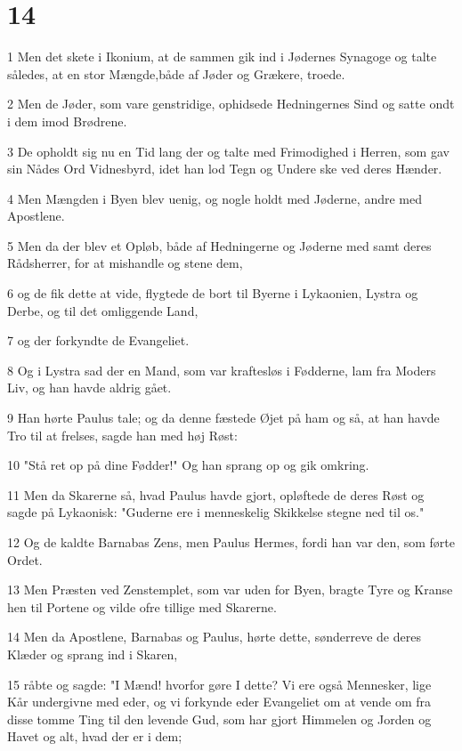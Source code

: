 \chapter{14}

\par 1 Men det skete i Ikonium, at de sammen gik ind i Jødernes Synagoge og talte således, at en stor Mængde,både af Jøder og Grækere, troede.
\par 2 Men de Jøder, som vare genstridige, ophidsede Hedningernes Sind og satte ondt i dem imod Brødrene.
\par 3 De opholdt sig nu en Tid lang der og talte med Frimodighed i Herren, som gav sin Nådes Ord Vidnesbyrd, idet han lod Tegn og Undere ske ved deres Hænder.
\par 4 Men Mængden i Byen blev uenig, og nogle holdt med Jøderne, andre med Apostlene.
\par 5 Men da der blev et Opløb, både af Hedningerne og Jøderne med samt deres Rådsherrer, for at mishandle og stene dem,
\par 6 og de fik dette at vide, flygtede de bort til Byerne i Lykaonien, Lystra og Derbe, og til det omliggende Land,
\par 7 og der forkyndte de Evangeliet.
\par 8 Og i Lystra sad der en Mand, som var kraftesløs i Fødderne, lam fra Moders Liv, og han havde aldrig gået.
\par 9 Han hørte Paulus tale; og da denne fæstede Øjet på ham og så, at han havde Tro til at frelses, sagde han med høj Røst:
\par 10 "Stå ret op på dine Fødder!" Og han sprang op og gik omkring.
\par 11 Men da Skarerne så, hvad Paulus havde gjort, opløftede de deres Røst og sagde på Lykaonisk: "Guderne ere i menneskelig Skikkelse stegne ned til os."
\par 12 Og de kaldte Barnabas Zens, men Paulus Hermes, fordi han var den, som førte Ordet.
\par 13 Men Præsten ved Zenstemplet, som var uden for Byen, bragte Tyre og Kranse hen til Portene og vilde ofre tillige med Skarerne.
\par 14 Men da Apostlene, Barnabas og Paulus, hørte dette, sønderreve de deres Klæder og sprang ind i Skaren,
\par 15 råbte og sagde: "I Mænd! hvorfor gøre I dette? Vi ere også Mennesker, lige Kår undergivne med eder, og vi forkynde eder Evangeliet om at vende om fra disse tomme Ting til den levende Gud, som har gjort Himmelen og Jorden og Havet og alt, hvad der er i dem;
